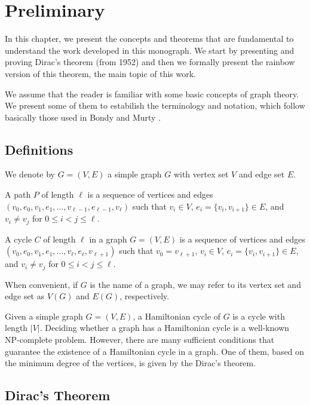
\chapter{Preliminary}

In this chapter, we present the concepts and theorems that are fundamental to understand the 
work developed in this monograph. We start by presenting and proving Dirac's theorem (from 1952) \cite{dirac1952} 
and then we formally present the rainbow version of this theorem, the main topic of this work.

We assume that the reader is familiar with some basic concepts of graph theory. We present some 
of them to estabilish the terminology and notation, which follow basically those used in Bondy and Murty \cite{bondy1976}.

\section{Definitions}

We denote by $G = (V, E)$ a simple graph $G$ with vertex set $V$ and edge set $E$.

A path $P$ of length $\ell$ is a sequence of vertices and edges $(v_0, e_0, v_1, e_1, \ldots, v_{\ell - 1}, e_{\ell - 1}, v_{\ell})$ such that
$v_i \in V$, $e_i = \{v_i, v_{i + 1}\} \in E$, and $v_i \neq v_j$ for $0 \leq i < j \leq \ell$.

A cycle $C$ of length $\ell$ in a graph $G = (V, E)$ is a sequence of vertices and edges $(v_0, e_0, v_1, e_1, \ldots, v_{\ell}, e_{\ell}, v_{\ell + 1})$ such that
$v_{0} = v_{\ell + 1}$, $v_i \in V$, $e_i = \{v_i, v_{i + 1}\} \in E$, and $v_i \neq v_j$ for $0 \leq i < j \leq \ell$.

When convenient, if $G$ is the name of a graph, we may refer to its vertex set and edge set as $V(G)$ and $E(G)$, respectively.

Given a simple graph $G = (V, E)$, a Hamiltonian cycle of $G$ is a cycle with length $|V|$.
Deciding whether a graph has a Hamiltonian cycle is a well-known NP-complete problem. 
However, there are many sufficient conditions that guarantee the existence of a Hamiltonian cycle in a graph. 
One of them, based on the minimum degree of the vertices, is given by the Dirac's theorem.

\section{Dirac's Theorem}

